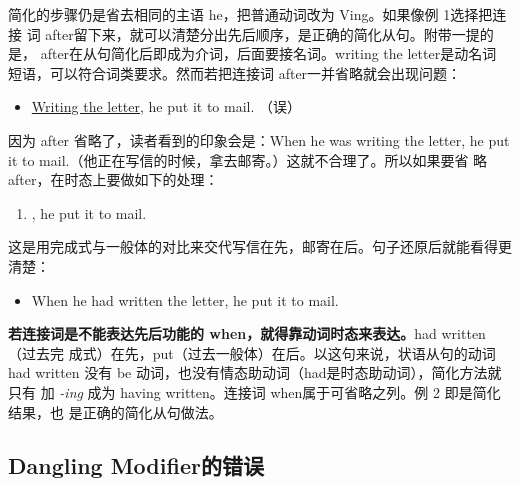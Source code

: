 简化的步骤仍是省去相同的主语 he，把普通动词改为 Ving。如果像例 1选择把连接
词 after留下来，就可以清楚分出先后顺序，是正确的简化从句。附带一提的
是， after在从句简化后即成为介词，后面要接名词。writing the letter是动名词
短语，可以符合词类要求。然而若把连接词 after一并省略就会出现问题：
\begin{itemize}
\item \ul{Writing the letter}, he put it to mail. （误）
\end{itemize}
因为 after 省略了，读者看到的印象会是：When he was writing the letter, he
put it to mail.（他正在写信的时候，拿去邮寄。）这就不合理了。所以如果要省
略 after，在时态上要做如下的处理：
\begin{enumerate}[resume]
\item {}, he put it to mail.
\end{enumerate}
这是用完成式与一般体的对比来交代写信在先，邮寄在后。句子还原后就能看得更清楚：
\begin{itemize}
\item When he had written the letter, he put it to mail.
\end{itemize}
\textbf{若连接词是不能表达先后功能的 when，就得靠动词时态来表达。}had written（过去完
成式）在先，put（过去一般体）在后。以这句来说，状语从句的动词had
written 没有 be 动词，也没有情态助动词（had是时态助动词），简化方法就只有
加 \emph{-ing} 成为 having written。连接词 when属于可省略之列。例 2 即是简化结果，也
是正确的简化从句做法。

\subsection{Dangling Modifier的错误}

